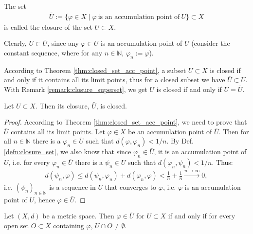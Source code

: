 \begin{defn}\label{defn:closure_set}
	The set 
	\begin{align}
		\bar{U} := \{\varphi\in X\mid \varphi\ \text{is an accumulation point of}\ U\} \subset X
	\end{align}
	is called the closure of the set $U \subset X$.
\end{defn}

\begin{remark}\label{remark:closure_superset}
	Clearly, $U\subset \bar{U}$, since any $\varphi\in U$ is an accumulation point of $U$ (consider the constant sequence, where for any $n\in\mathbb N$, $\varphi_n := \varphi$).
\end{remark}

\begin{remark}
	According to Theorem \ref{thm:closed_set_acc_point}, a subset $U\subset X$ is closed if and only if it contains all its limit points, thus for a closed subset we have $\overline{U} \subset U$. With Remark \ref{remark:closure_superset}, we get $U$ is closed if and only if $U = \overline{U}$.
\end{remark}

\begin{theorem}\label{thrm:closure_closed}
	Let $U\subset X$. Then its closure, $\bar{U}$, is closed.
\end{theorem}

\begin{proof}
	According to Theorem \ref{thm:closed_set_acc_point}, we need to prove that $\bar{U}$ contains all its limit points. Let $\varphi\in X$ be an accumulation point of $\overline{U}$. Then for all $n\in \mathbb N$ there is a $\varphi_n\in\overline{U}$ such that $d(\varphi, \varphi_n) < 1/n$. By Def. \ref{defn:closure_set}, we also know that since $\varphi_n\in \bar{U}$, it is an accumulation point of $U$, i.e. for every $\varphi_n\in \overline{U}$ there is a $\psi_n\in U$ such that $d(\varphi_n, \psi_n) < 1/n$. Thus:
	\begin{align}
		d(\psi_n, \varphi) \leq d(\psi_n, \varphi_n) + d(\varphi_n, \varphi) < \frac{1}{n} + \frac{1}{n} \overset{n\to\infty}{\longrightarrow} 0,
	\end{align}
	i.e. $(\psi_n)_{n\in\mathbb N}$ is a sequence in $U$ that converges to $\varphi$, i.e. $\varphi$ is an accumulation point of $U$, hence $\varphi\in \bar{U}$.
\end{proof}

\begin{theorem}\label{thrm:property_metric_space}
	Let $(X, d)$ be a metric space. Then $\varphi\in \overline{U}$ for $U\subset X$ if and only if for every open set $O\subset X$ containing $\varphi$, $U\cap O\ne \emptyset$.
\end{theorem}

